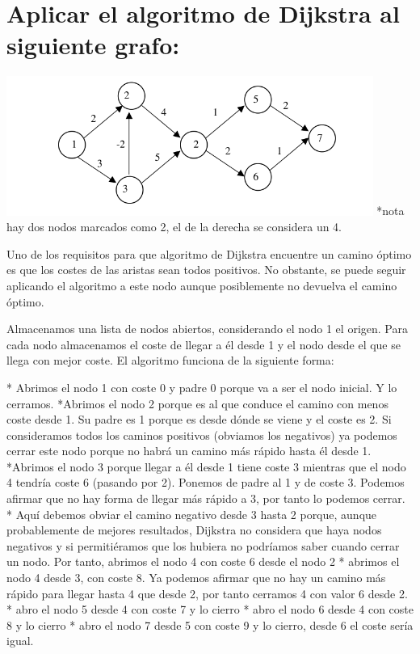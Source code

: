 \documentclass[a4paper, 11pt]{article}
\begin{document}
\section{Aplicar el algoritmo de Dijkstra al siguiente grafo:}
 \includegraphics[width=0.9\textwidth]{grafo.png}
 *nota hay dos nodos marcados como 2, el de la derecha se considera un 4.
 
Uno de los requisitos para que algoritmo de Dijkstra encuentre un camino óptimo es que los costes de las aristas sean todos positivos. No obstante, se puede seguir aplicando el algoritmo a este nodo aunque posiblemente no devuelva el camino óptimo. 

Almacenamos una lista de nodos abiertos, considerando el nodo 1 el origen. Para cada nodo almacenamos el coste de llegar a él desde 1 y el nodo desde el que se llega con mejor coste. El algoritmo funciona de la siguiente forma: 

* Abrimos el nodo 1 con coste 0 y padre 0 porque va a ser el nodo inicial. Y lo cerramos.
*Abrimos el nodo 2 porque es al que conduce el camino con menos coste desde 1. Su padre es 1 porque es desde dónde se viene y el coste es 2. Si consideramos todos los caminos positivos (obviamos los negativos) ya podemos cerrar este nodo porque no habrá un camino más rápido hasta él desde 1.
*Abrimos el nodo 3 porque llegar a él desde 1 tiene coste 3 mientras que el nodo 4 tendría coste 6 (pasando por 2). Ponemos de padre al 1 y de coste 3. Podemos afirmar que no hay forma de llegar más rápido a 3, por tanto lo podemos cerrar.
* Aquí debemos obviar el camino negativo desde 3 hasta 2 porque, aunque probablemente de mejores resultados, Dijkstra no considera que haya nodos negativos y si permitiéramos que los hubiera no podríamos saber cuando cerrar un nodo. Por tanto, abrimos el nodo 4 con coste 6 desde el nodo 2 
* abrimos el nodo 4 desde 3, con coste 8. Ya podemos afirmar que no hay un camino más rápido para llegar hasta 4 que desde 2, por tanto cerramos 4 con valor 6 desde 2.
* abro el nodo 5 desde 4 con coste 7 y lo cierro
* abro el nodo 6 desde 4 con coste 8 y lo cierro
* abro el nodo 7 desde 5 con coste 9 y lo cierro, desde 6 el coste sería igual. 
 
\end{document}

